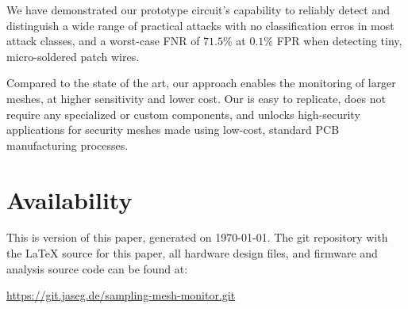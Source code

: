 \documentclass[final]{iacrtrans}
\begin{document}
We have demonstrated our prototype circuit's capability to reliably detect and distinguish a wide range of practical
attacks with no classification erros in most attack classes, and a worst-case FNR of $71.5\%$ at $0.1\%$ FPR when
detecting tiny, micro-soldered patch wires.

Compared to the state of the art, our approach enables the monitoring of larger meshes, at higher sensitivity and lower
cost. Our is easy to replicate, does not require any specialized or custom components, and unlocks high-security
applications for security meshes made using low-cost, standard PCB manufacturing processes.

\section*{Availability}
This is version \texttt{\unskip} of this paper, generated on \today. The git repository with the
LaTeX source for this paper, all hardware design files, and firmware and analysis source code can be found at:

\begin{center}
    \url{https://git.jaseg.de/sampling-mesh-monitor.git}
\end{center}

\FloatBarrier

\printbibliography[heading=bibintoc]
\end{document}
